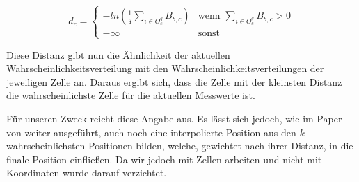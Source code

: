 \begin{equation}
	d_{c}= \begin{cases}
	-ln (\frac{1}{q} \sum_{i \in O_{c}^{q}} B_{b, c}) & \text{wenn } \sum_{i \in O_{c}^{q}} B_{b, c} > 0 \\
	- \infty & \text{sonst}
	\end{cases}
\end{equation}

Diese Distanz gibt nun die Ähnlichkeit der aktuellen Wahrscheinlichkeitsverteilung mit den Wahrscheinlichkeitsverteilungen der jeweiligen Zelle an. Daraus ergibt sich, dass die Zelle mit der kleinsten Distanz die wahrscheinlichste Zelle für die aktuellen Messwerte ist.

Für unseren Zweck reicht diese Angabe aus. Es lässt sich jedoch, wie im Paper von \citet{wifiFingerprintProbability} weiter ausgeführt, auch noch eine interpolierte Position aus den $k$ wahrscheinlichsten Positionen bilden, welche, gewichtet nach ihrer Distanz, in die finale Position einfließen. Da wir jedoch mit Zellen arbeiten und nicht mit Koordinaten wurde darauf verzichtet.
